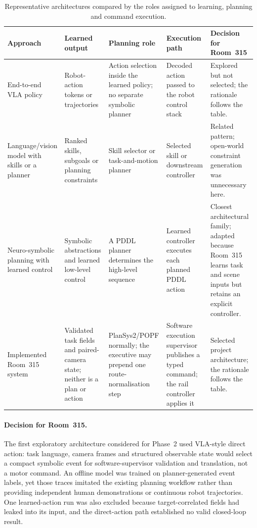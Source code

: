 \begin{table}[H]
\centering
\caption{Representative architectures compared by the roles assigned to
learning, planning and command execution.}
\label{tab:architecture-comparison}
\begingroup
\footnotesize
\setlength{\tabcolsep}{3pt}
\renewcommand{\arraystretch}{1.08}
\begin{tabularx}{\textwidth}{@{}
>{\raggedright\arraybackslash}p{}
>{\raggedright\arraybackslash}p{}
>{\raggedright\arraybackslash}p{}
>{\raggedright\arraybackslash}p{}
>{\raggedright\arraybackslash}X@{}}
\toprule
\textbf{Approach} & \textbf{Learned output} & \textbf{Planning role} &
\textbf{Execution path} & \textbf{Decision for Room~315}\\
\midrule
End-to-end VLA policy & Robot-action tokens or trajectories & Action selection
inside the learned policy; no separate symbolic planner & Decoded action passed
to the robot control stack & Explored but not selected; the rationale follows
the table.\\
\tablerowrule
Language/vision model with skills or a planner & Ranked skills, subgoals or planning
constraints & Skill selector or task-and-motion planner & Selected skill or
downstream controller & Related pattern; open-world constraint generation was
unnecessary here.\\
\tablerowrule
Neuro-symbolic planning with learned control & Symbolic abstractions and learned
low-level control & A PDDL
planner determines the high-level sequence & Learned controller executes each
planned PDDL action & Closest architectural family; adapted because Room~315 learns
task and scene inputs but retains an explicit controller.\\
\tablerowrule
Implemented Room~315 system & Validated task fields and paired-camera state;
neither is a plan or action & PlanSys2/POPF normally; the executive may prepend
one route-normalisation step & Software execution supervisor
publishes a typed command; the rail controller applies it &
Selected project architecture; the rationale follows the table.\\
\bottomrule
\end{tabularx}
\endgroup
\end{table}

\paragraph{Decision for Room~315.}\label{sec:ai-planning-decision}
The first exploratory architecture considered for Phase~2 used VLA-style direct
action: task language, camera frames and structured observable state would
select a compact symbolic event for software-supervisor validation and
translation, not a motor command.
An offline model was trained on planner-generated event labels, yet those traces
imitated the existing planning workflow rather than providing independent human
demonstrations or continuous robot trajectories. One learned-action run was
also excluded because target-correlated fields had leaked into its input, and
the direct-action path established no valid closed-loop result.

